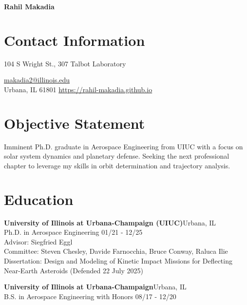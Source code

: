 \documentclass[margin,line]{res}
\newlength{\myspacing}
\newif\ifphone
\begin{document}
\hspace{\myspacing}
\hspace{2.2in}
\huge{\bf Rahil Makadia}

\normalsize
\begin{resume}

\section{\sc Contact Information}
104 S Wright St., 307 Talbot Laboratory \hfill
\ifphone
 \textbar\,
\fi
\href{mailto:makadia2@illinois.edu}{makadia2@illinois.edu}\\
Urbana, IL 61801 \hfill
\href{https://rahil-makadia.github.io/}{https://rahil-makadia.github.io}

\section{\sc Objective Statement}
Imminent Ph.D. graduate in Aerospace Engineering from UIUC with a focus on solar system dynamics and planetary defense. Seeking the next professional chapter to leverage my skills in orbit determination and trajectory analysis.

\section{\sc Education}
{\bf University of Illinois at Urbana-Champaign (UIUC)}\hfill Urbana, IL\\
Ph.D. in Aerospace Engineering \hfill {01/21 - 12/25}\\
Advisor: Siegfried Eggl\\
Committee: Steven Chesley, Davide Farnocchia, Bruce Conway, Raluca Ilie\\
Dissertation: Design and Modeling of Kinetic Impact Missions for Deflecting Near-Earth Asteroids
(Defended 22 July 2025)

{\bf University of Illinois at Urbana-Champaign}\hfill Urbana, IL\\
B.S. in Aerospace Engineering with Honors \hfill {08/17 - 12/20}


\end{resume}
\end{document}
